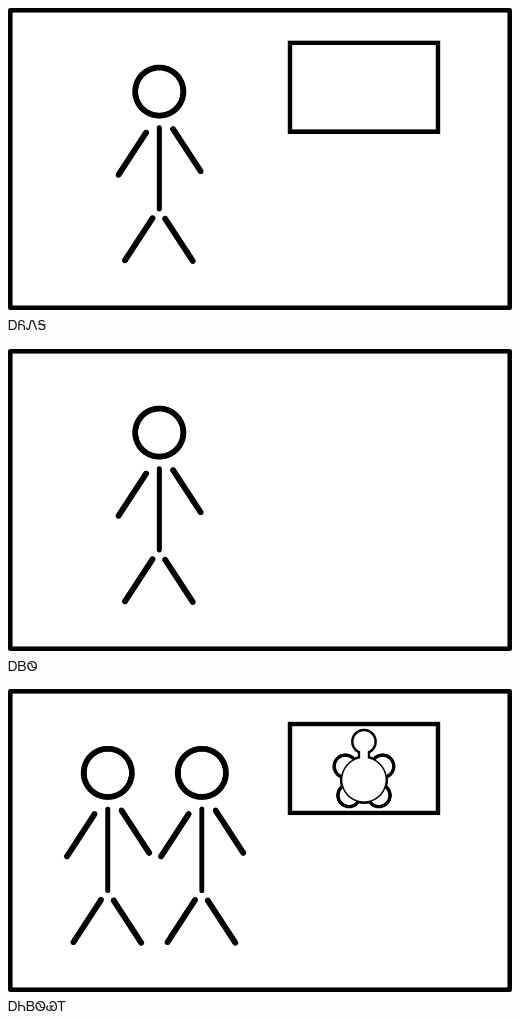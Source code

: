\documentclass[avery5371]{flashcards}%
\begin{document}
\begin{flashcard}{
\includegraphics[width=0.95\columnwidth,height=.51\columnwidth,keepaspectratio]{../artwork/flags/ayonega-flag}
}\Huge ᎠᏲᏁᎦ
\end{flashcard}

\begin{flashcard}{
\includegraphics[width=0.95\columnwidth,height=.51\columnwidth,keepaspectratio]{../artwork/flags/ayvwi-no-flag}
}\Huge ᎠᏴᏫ
\end{flashcard}


\begin{flashcard}{
\includegraphics[width=0.95\columnwidth,height=.51\columnwidth,keepaspectratio]{../artwork/flags/anidaksi-flag}
}\Huge ᎠᏂᏴᏫᏯᎢ
\end{flashcard}
\end{document}
